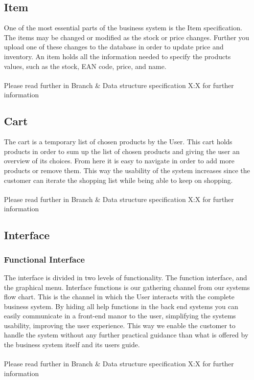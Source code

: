 \documentclass[11pt]{article}
\begin{document}
\subsection{Item}
One of the most essential parts of the business system is the Item specification. The items may be changed or modified as the stock or price changes. Further you upload one of these changes to the database in order to update price and inventory. An item holds all the information needed to specify the products values, such as the stock, EAN code, price, and name.
\\\\
Please read further in Branch \& Data structure specification X:X for further information
\subsection{Cart}
The cart is a temporary list of chosen products by the User.  This cart holds products in order to sum up the list of chosen products and giving the user an overview of its choices. From here it is easy to navigate in order to add more products or remove them. This way the usability of the system increases since the customer can iterate the shopping list while being able to keep on shopping.\\\\
Please read further in Branch \& Data structure specification X:X for further information\\
\subsection{Interface}
\subsubsection{Functional Interface}
The interface is divided in two levels of functionality. The function interface, and the graphical menu.
Interface functions is our gathering channel from our systems flow chart. This is the channel in which the User interacts with the complete business system. By hiding all help functions in the back end systems you can easily communicate in a front-end manor to the user, simplifying the systems usability, improving the user experience. This way we enable the customer to handle the system without any further practical guidance than what is offered by the business system itself and its users guide.
\\\\
Please read further in Branch \& Data structure specification X:X for further information
\end{document}
